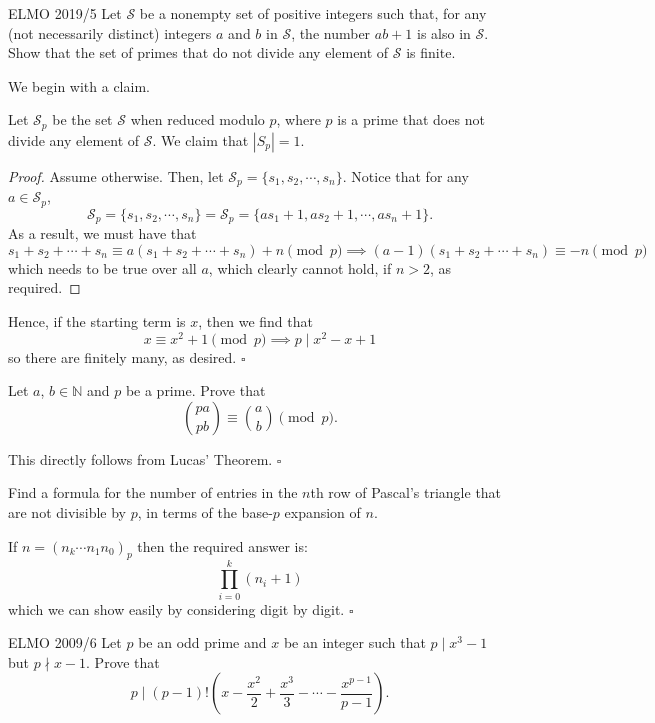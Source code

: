 \documentclass{article}
\begin{document}
\begin{problem}[2.14.17]{ELMO 2019/5}
Let $\mathcal{S}$ be a nonempty set of positive integers such that, for any (not necessarily distinct) integers $a$ and $b$ in $\mathcal{S}$, the number $ab + 1$ is also in $\mathcal{S}$. Show that the set of primes that do not divide any element of $\mathcal{S}$ is finite.
\end{problem}

We begin with a claim.
\begin{claim*}
Let $\mathcal{S}_p$ be the set $\mathcal{S}$ when reduced modulo $p$, where $p$ is a prime that does not divide any element of $\mathcal{S}$. We claim that $|S_p| = 1$.
\end{claim*}
\begin{proof}
Assume otherwise. Then, let $\mathcal{S}_p = \{s_1, s_2, \cdots, s_n\}$. Notice that for any $a \in \mathcal{S}_p$, \[\mathcal{S}_p = \{s_1, s_2, \cdots, s_n\} = \mathcal{S}_p = \{as_1+1, as_2+1, \cdots, as_n+1\}.\] As a result, we must have that \[s_1+s_2+\cdots+s_n \equiv a(s_1+s_2+\cdots+s_n)+n \pmod{p} \implies (a-1)(s_1+s_2+\cdots+s_n) \equiv -n \pmod{p}\] which needs to be true over all $a$, which clearly cannot hold, if $n > 2$, as required.
\end{proof}
Hence, if the starting term is $x$, then we find that \[x \equiv x^2+1 \pmod{p} \implies p \mid x^2-x+1\] so there are finitely many, as desired. $\square$

\begin{problem}[2.14.18]{}
Let $a$, $b \in \mathbb{N}$ and $p$ be a prime. Prove that \[\binom{pa}{pb} \equiv \binom{a}{b} \pmod{p}.\]
\end{problem}
This directly follows from Lucas' Theorem. $\square$

\begin{problem}[2.14.19]{}
Find a formula for the number of entries in the $n$th row of Pascal's triangle that are not divisible by $p$, in terms of the base-$p$ expansion of $n$.
\end{problem}

If $n = (n_k\cdots n_1n_0)_p$ then the required answer is: \[\boxed{\prod_{i=0}^k (n_i+1)}\] which we can show easily by considering digit by digit. $\square$

\begin{problem}[2.14.20]{ELMO 2009/6}
Let $p$ be an odd prime and $x$ be an integer such that $p \mid x^3 - 1$ but $p \nmid x - 1$. Prove that \[p \mid (p - 1)!\left(x -\dfrac{x^2}{2} +\dfrac{x^3}{3} - \cdots - \dfrac{x^{p-1}}{p-1}\right).\]
\end{problem}
\end{document}
